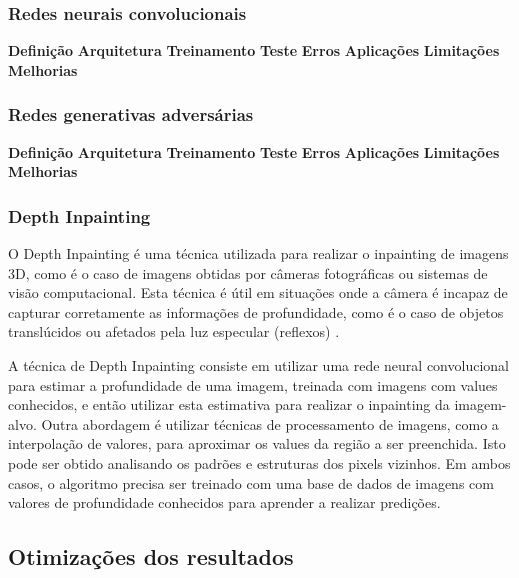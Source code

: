 \subsubsection{Redes neurais convolucionais} \label{cnn}
\textbf{Definição} \label{cnn-def}
\textbf{Arquitetura} \label{cnn-arch}
\textbf{Treinamento} \label{cnn-train}
\textbf{Teste} \label{cnn-test}
\textbf{Erros} \label{cnn-err}
\textbf{Aplicações} \label{cnn-app}
\textbf{Limitações} \label{cnn-lim}
\textbf{Melhorias} \label{cnn-impr}

\subsubsection{Redes generativas adversárias} \label{gan}
\textbf{Definição} \label{gan-def}
\textbf{Arquitetura} \label{gan-arch}
\textbf{Treinamento} \label{gan-train}
\textbf{Teste} \label{gan-test}
\textbf{Erros} \label{gan-err}
\textbf{Aplicações} \label{gan-app}
\textbf{Limitações} \label{gan-lim}
\textbf{Melhorias} \label{gan-impr}


\subsubsection{Depth Inpainting} \label{quality-depth}
O Depth Inpainting é uma técnica utilizada para realizar o inpainting de imagens 3D, como é o caso de imagens obtidas por câmeras fotográficas ou sistemas de visão computacional. Esta técnica é útil em situações onde a câmera é incapaz de capturar corretamente as informações de profundidade, como é o caso de objetos translúcidos ou afetados pela luz especular (reflexos) \cite{shish20203dphoto}.

A técnica de Depth Inpainting consiste em utilizar uma rede neural convolucional para estimar a profundidade de uma imagem, treinada com imagens com values conhecidos, e então utilizar esta estimativa para realizar o inpainting da imagem-alvo. Outra abordagem é utilizar técnicas de processamento de imagens, como a interpolação de valores, para aproximar os values da região a ser preenchida. \cite{shish20203dphoto} Isto pode ser obtido analisando os padrões e estruturas dos pixels vizinhos. Em ambos casos, o algoritmo precisa ser treinado com uma base de dados de imagens com valores de profundidade conhecidos para aprender a realizar predições.



\subsection{Otimizações dos resultados}

